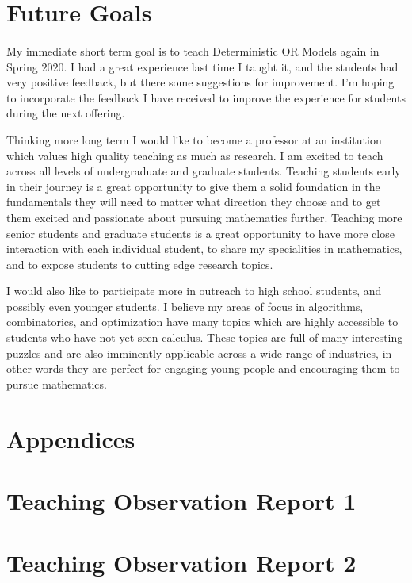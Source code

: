 \documentclass{article}
\begin{document}
\section{Future Goals}

\paragraph{}
My immediate short term goal is to teach Deterministic OR Models again in Spring $2020$. I had a great experience last time I taught it, and the students had very positive feedback, but there some suggestions for improvement. I'm hoping to incorporate the feedback I have received to improve the experience for students during the next offering.

Thinking more long term I would like to become a professor at an institution which values high quality teaching as much as research. I am excited to teach across all levels of undergraduate and graduate students. Teaching students early in their journey is a great opportunity to give them a solid foundation in the fundamentals they will need to matter what direction they choose and to get them excited and passionate about pursuing mathematics further. Teaching more senior students and graduate students is a great opportunity to have more close interaction with each individual student, to share my specialities in mathematics, and to expose students to cutting edge research topics.

I would also like to participate more in outreach to high school students, and possibly even younger students. I believe my areas of focus in algorithms, combinatorics, and optimization have many topics which are highly accessible to students who have not yet seen calculus. These topics are full of many interesting puzzles and are also imminently applicable across a wide range of industries, in other words they are perfect for engaging young people and encouraging them to pursue mathematics.

\appendix
\section*{Appendices}
\section{Teaching Observation Report 1}\label{sec:observation-report-1}

\section{Teaching Observation Report 2}\label{sec:observation-report-2}
\end{document}
